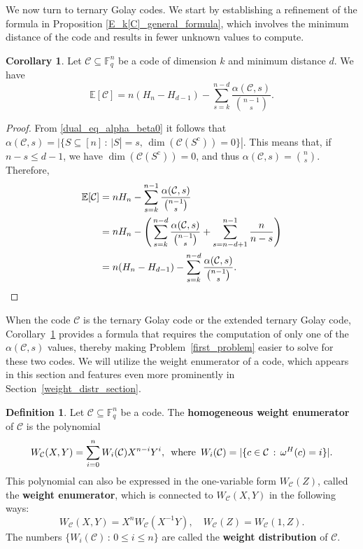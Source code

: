 \documentclass[11pt,a4paper,reqno,twoside]{article}
\theoremstyle{definition}
\newtheorem{corollary}[theorem]{Corollary}
\newtheorem{definition}[theorem]{Definition}
\newcommand{\F}{\mathbb{F}}
\newcommand{\E}{\mathbb{E}}
\newcommand{\mC}{\mathcal{C}}
\begin{document}
We now turn to ternary Golay codes.
We start by establishing a refinement of the formula in Proposition \ref{E_k[C]_general_formula}, which involves the minimum distance of the code and results in fewer unknown values to compute. 

\begin{corollary} \label{E[C]_general_enhanced}
    Let $\mC \subseteq \F_q^n$ be a code of dimension $k$ and minimum distance $d$. We have
    \[
    \E[\mC] = n(H_n - H_{d-1}) -  \sum_{s=k}^{n-d} \frac{\alpha(\mathcal{C},s)}{\binom{n-1}{s}}.
    \]
\end{corollary}
\begin{proof}
    From \eqref{dual_eq_alpha_beta0} it follows that
   $    \alpha(\mathcal{C},s) = | \{ S \subseteq [n] \, : \,  |S| = s, \, \dim(\mathcal{C}(S^{\mathrm{c}})) = 0 \} |$.
    This means that, if $n-s \leq d-1$,
    we have $\dim(\mathcal{C}(S^{\mathrm{c}})) = 0$,  and thus $\alpha(\mathcal{C},s) = \binom{n}{s}$. 
    Therefore,
    \[
    \begin{split}
    \E[\mC] & = nH_n -  \sum_{s=k}^{n-1} \frac{\alpha(\mathcal{C},s)}{\binom{n-1}{s}} \\
    & = nH_n -  \Bigg(\sum_{s=k}^{n-d} \frac{\alpha(\mathcal{C},s)}{\binom{n-1}{s}} + \sum_{s=n-d+1}^{n-1} \frac{n}{n-s}\Bigg) \\
    & = n(H_n - H_{d-1}) -  \sum_{s=k}^{n-d} \frac{\alpha(\mathcal{C},s)}{\binom{n-1}{s}}. \qedhere
    \end{split}
    \]
\end{proof}

When the code $\mC$ is the ternary Golay code or the extended ternary Golay code, Corollary~\ref{E[C]_general_enhanced} provides a formula that requires the computation of only one of the $\alpha(\mC,s)$ values, thereby making Problem~\ref{first_problem} easier to solve for these two codes. We will utilize the weight enumerator of a code, which appears in this section and features even more prominently in Section~\ref{weight_distr_section}.


\begin{definition}
    Let $\mC \subseteq \F_q^n$ be a code. The \textbf{homogeneous weight enumerator} of $\mC$ is the polynomial
    \[
    W_{\mC}(X,Y) = \sum_{i=0}^n W_i(\mC) X^{n-i} Y^i, \, \textnormal{ where } \, W_i(\mC) = |\{ c \in \mC \, : \, \omega^H(c) = i \}|.
    \]
This polynomial can also be expressed in the one-variable form $W_{\mC}(Z)$, called the \textbf{weight enumerator}, which is connected to $W_{\mC}(X,Y)$ in the following ways:
    \[
    W_{\mC}(X,Y) = X^nW_{\mC}(X^{-1}Y), \quad W_{\mC}(Z) = W_{\mC}(1,Z).
    \]
The numbers $\{W_i(\mC) \, :\, 0 \le i \le n\}$ are called the \textbf{weight distribution} of $\mC$.
\end{definition}
\end{document}
